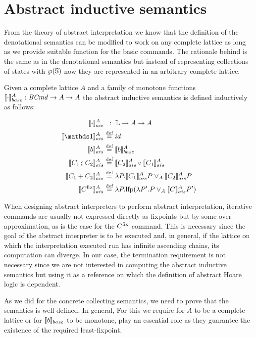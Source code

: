 \documentclass[
  10pt,       %
  twoside,    %
  a4paper,    %
  english,    %
  tikz,       %
  openright,  %
]{book}
\begin{document}
\section{Abstract inductive semantics}

From the theory of abstract interpretation we know that the definition of the
denotational semantics can be modified to work on any complete lattice as long
as we provide suitable function for the basic commands. The rationale
behind is the same as in the denotational semantics but instead of representing
collections of states with $\wp(\mathbb{S})$ now they are represented in an
arbitrary complete lattice.

\begin{definition}

  \label{def:abstract-inductive-semantics}
  Given a complete lattice $A$ and a family of monotone functions $\llbracket \cdot \rrbracket_{base}^A : 
  \mathit{BCmd} \to A \to A$ the abstract inductive semantics is defined inductively as 
  follows:

  \begin{align*}
      \asem{\cdot}         & \;\;:\; \lang \to A \to A \\
      \asem{\sskip}         &\defeq id \\
      \asem{b}             &\defeq \bsem{b}^A \\
      \asem{C_1 \fcmp C_2} &\defeq \asem{C_2} \circ \asem{C_1} \\
      \asem{C_1 + C_2}     &\defeq \lambda P . \asem{C_1} P \join_A \asem{C_2} P \\
      \asem{C^\fix}        &\defeq \lambda P . \lfp(\lambda P'. P \join_A \asem{C} P')
  \end{align*}
\end{definition}


When designing abstract interpreters to perform abstract interpretation,
iterative commands are usually not expressed directly as fixpoints but by
some over-approximation, as is the case for the $C^{\mathrm{fix}}$ command. This is
necessary since the goal of the abstract interpreter is to be executed and, in
general, if the lattice on which the interpretation executed run has infinite
ascending chains, its computation can diverge. In our case, the termination
requirement is not necessary since we are not interested in computing the abstract
inductive semantics but using it as a reference on which the definition of
abstract Hoare logic is dependent.


As we did for the concrete collecting semantics, we need to prove that the
semantics is well-defined. In general, For this we require for $A$
to be a complete lattice or for $\llbracket b \rrbracket_{base}$ to be monotone, play an essential role
as they guarantee the existence of the required least-fixpoint.
\end{document}
